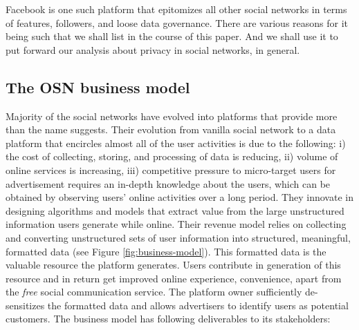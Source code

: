 \documentclass[a4paper,twoside]{article}
\begin{document}
Facebook is one such platform that epitomizes all other social
networks in terms of features, followers, and loose data
governance. There are various reasons for it being such that we shall
list in the course of this paper. And we shall use it to put forward
our analysis about privacy in social networks, in general.



\subsection{The OSN business model}
\noindent Majority of the social networks have evolved into platforms
that provide more than the name suggests. Their evolution from vanilla
social network to a data platform that encircles almost all of the
user activities is due to the following: i) the cost of collecting,
storing, and processing of data is reducing, ii) volume of online
services is increasing, iii) competitive pressure to micro-target
users for advertisement requires an in-depth knowledge about the
users, which can be obtained by observing users' online activities
over a long period. They innovate in designing algorithms and models
that extract value from the large unstructured information users
generate while online. Their revenue model relies on collecting and
converting unstructured sets of user information into structured,
meaningful, formatted data (see Figure \ref{fig:business-model}). This
formatted data is the valuable resource the platform generates. Users
contribute in generation of this resource and in return get improved
online experience, convenience, apart from the \textit{free} social
communication service. The platform owner sufficiently de-sensitizes
the formatted data and allows advertisers to identify users as
potential customers. The business model has following deliverables to
its stakeholders:
\end{document}
